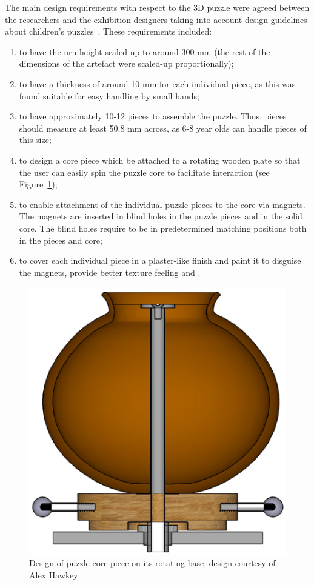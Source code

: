\documentclass[acmlarge,screen,dvipsnames]{acmart}
\begin{document}
The main design requirements with respect to the 3D puzzle were agreed
between the researchers and the exhibition designers taking into
account design guidelines about children's
puzzles~\cite{Smith2002}. These requirements included:
%
\begin{enumerate}
\item to have the urn height scaled-up to around 300 mm (the rest of
  the dimensions of the artefact were scaled-up proportionally);
\item to have a thickness of around 10 mm for each individual piece,
  as this was found suitable for easy handling by small hands;
\item to have approximately 10-12 pieces to assemble the puzzle. Thus,
  pieces should measure at least 50.8 mm across, as 6-8 year olds can
  handle pieces of this size;
\item to design a core piece which  be attached to a rotating
  wooden plate so that the user can easily spin the puzzle core to
  facilitate interaction (see Figure~\ref{fig:alexdesign});
\item to enable attachment of the individual puzzle pieces to the core
  via magnets. The magnets are inserted in blind holes in the puzzle
  pieces and in the solid core. The blind holes require to be in
  predetermined matching positions both in the pieces and core;
\item to cover each individual piece in a plaster-like finish and
  paint it to disguise the magnets, provide better texture feeling and
  .
\end{enumerate} 
%
\begin{figure}[htb]
  \centering
  \includegraphics[width=0.5\linewidth]{images/alexdesign}
  \caption{\label{fig:alexdesign}%
    Design of puzzle core piece on its rotating base, design courtesy of Alex Hawkey}
\end{figure}
\end{document}
